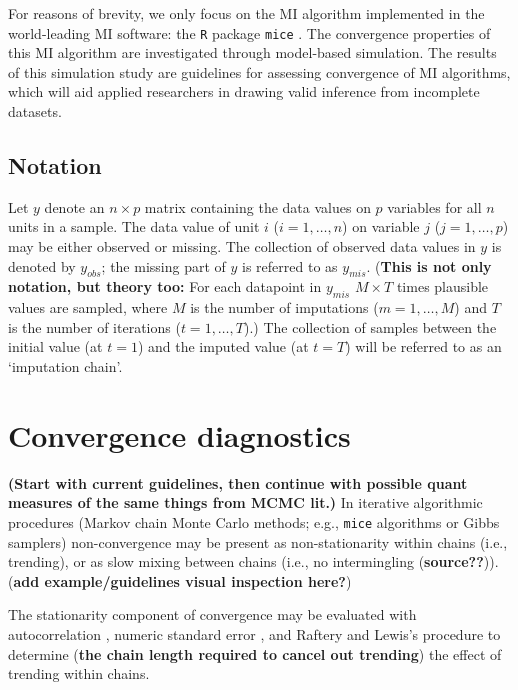 \documentclass[Royal,times,sageh]{sagej}
\begin{document}
For reasons of brevity, we only focus on the MI algorithm implemented in
the world-leading MI software: the \texttt{R} \citep{R} package
\texttt{mice} \citep{mice}. The convergence properties of this MI
algorithm are investigated through model-based simulation. The results
of this simulation study are guidelines for assessing convergence of MI
algorithms, which will aid applied researchers in drawing valid
inference from incomplete datasets.

\hypertarget{notation}{%
\subsection{Notation}\label{notation}}

Let \(y\) denote an \(n \times p\) matrix containing the data values on
\(p\) variables for all \(n\) units in a sample. The data value of unit
\(i\) (\(i = 1, \dots, n\)) on variable \(j\) (\(j = 1, \dots, p\)) may
be either observed or missing. The collection of observed data values in
\(y\) is denoted by \(y_{obs}\); the missing part of \(y\) is referred
to as \(y_{mis}\). (\textbf{This is not only notation, but theory too:}
For each datapoint in \(y_{mis}\) \(M \times T\) times plausible values
are sampled, where \(M\) is the number of imputations
(\(m = 1, \dots, M\)) and \(T\) is the number of iterations
(\(t = 1, \dots, T\)).) The collection of samples between the initial
value (at \(t=1\)) and the imputed value (at \(t=T\)) will be referred
to as an `imputation chain'.

\hypertarget{convergence-diagnostics}{%
\section{Convergence diagnostics}\label{convergence-diagnostics}}

\textbf{(Start with current guidelines, then continue with possible
quant measures of the same things from MCMC lit.)} In iterative
algorithmic procedures (Markov chain Monte Carlo methods; e.g.,
\texttt{mice} algorithms or Gibbs samplers) non-convergence may be
present as non-stationarity within chains (i.e., trending), or as slow
mixing between chains (i.e., no intermingling (\textbf{source??})).
(\textbf{add example/guidelines visual inspection here?})

The stationarity component of convergence may be evaluated with
autocorrelation \citep[\(AC\);][]{scha97, gelm13}, numeric standard
error \citep[or `MC error';][]{gewe92}, and Raftery and Lewis's
\citeyearpar{raft91} procedure to determine (\textbf{the chain length
required to cancel out trending}) the effect of trending within chains.
\end{document}
